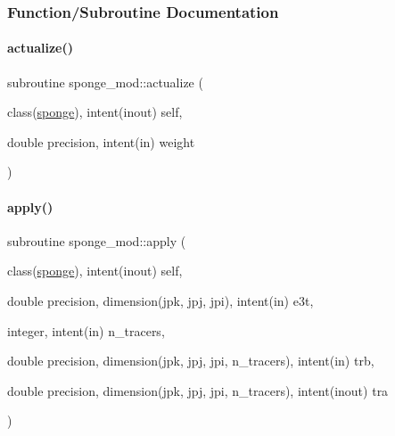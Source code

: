 \subsubsection{Function/\+Subroutine Documentation}
\mbox{\label{namespacesponge__mod_a791a9724fe6e817486294d084651901d}} 
\paragraph{\texorpdfstring{actualize()}{actualize()}}
{\footnotesize\ttfamily subroutine sponge\+\_\+mod\+::actualize (\begin{DoxyParamCaption}\item[{class(\mbox{\hyperlink{structsponge__mod_1_1sponge}{sponge}}), intent(inout)}]{self,  }\item[{double precision, intent(in)}]{weight }\end{DoxyParamCaption})\hspace{0.3cm}{\ttfamily [private]}}

\mbox{\label{namespacesponge__mod_a1aa7ab89cfc23b82c5bad4e63e056b45}} 
\paragraph{\texorpdfstring{apply()}{apply()}}
{\footnotesize\ttfamily subroutine sponge\+\_\+mod\+::apply (\begin{DoxyParamCaption}\item[{class(\mbox{\hyperlink{structsponge__mod_1_1sponge}{sponge}}), intent(inout)}]{self,  }\item[{double precision, dimension(jpk, jpj, jpi), intent(in)}]{e3t,  }\item[{integer, intent(in)}]{n\+\_\+tracers,  }\item[{double precision, dimension(jpk, jpj, jpi, n\+\_\+tracers), intent(in)}]{trb,  }\item[{double precision, dimension(jpk, jpj, jpi, n\+\_\+tracers), intent(inout)}]{tra }\end{DoxyParamCaption})\hspace{0.3cm}{\ttfamily [private]}}

\mbox{\label{namespacesponge__mod_ab024fda493622a2ac4e6f08ca72f2a3a}} 
